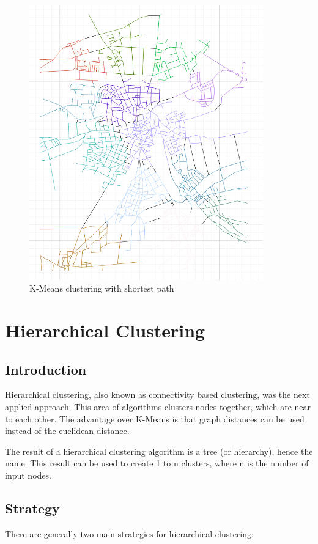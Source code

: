 \documentclass[11pt, a4paper]{report}
\begin{document}
\begin{figure}[!h]
    \centering
    \includegraphics[width=0.9\textwidth]{clusteranalysis_kmeansExt_result.png}
    \caption{K-Means clustering with shortest path\label{fig:Kmeansshortestp}}
\end{figure}

\section{Hierarchical Clustering} \label{hierarchicalClustering}
\subsection{Introduction}
Hierarchical clustering, also known as connectivity based clustering, was the next applied approach. This area of algorithms clusters nodes together, which are near to each other. The advantage over K-Means is that graph distances can be used instead of the euclidean distance.

The result of a hierarchical clustering algorithm is a tree (or hierarchy), hence the name. This result can be used to create 1 to n clusters, where n is the number of input nodes.

\subsection{Strategy}
There are generally two main strategies for hierarchical clustering:
\end{document}
